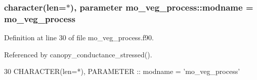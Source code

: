\subsubsection[{modname}]{\setlength{\rightskip}{0pt plus 5cm}character(len=$\ast$), parameter mo\+\_\+veg\+\_\+process\+::modname = \textquotesingle{}mo\+\_\+veg\+\_\+process\textquotesingle{}}\label{namespacemo__veg__process_a38c37cf4dadc4e6507b052eb4357357f}


Definition at line 30 of file mo\+\_\+veg\+\_\+process.\+f90.



Referenced by canopy\+\_\+conductance\+\_\+stressed().


\begin{DoxyCode}
30   \textcolor{keywordtype}{CHARACTER(len=*)}, \textcolor{keywordtype}{PARAMETER} :: modname = \textcolor{stringliteral}{'mo\_veg\_process'}
\end{DoxyCode}
